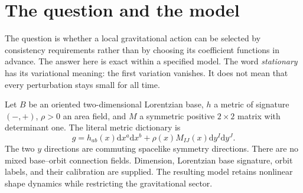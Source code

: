 \documentclass[11pt]{article}
\newcommand{\dd}{\mathrm d}
\begin{document}
\begin{abstract}
We present a conditional selection theorem linking canonical quantum-state geometry to a symmetry-restricted gravitational action. Centered one-mode states saturating the Robertson--Schr\"odinger covariance bound determine positive unimodular matrices with hyperbolic information geometry. A calibrated common frame representation identifies these matrices with the shape of two spacelike symmetry orbits. Within a local invariant action class of total derivative order at most two, full first-variation stationarity of a Milne--polar flat-space chart selects the affine coefficient family and a constant parity-odd coupling. An off-shell identity identifies the selected bulk action with reduced Einstein--Hilbert gravity. We make explicit the associated finite-distance fidelity and Berry-curvature formulas, complete sharp pointwise coefficient-inference bounds, integrate them into near-affine estimates, and test the nonlinear evolution against an exact geodesic/Bessel solution. The accompanying bundle preserves the source lineage and provides 48 compiled Lean theorems, exact symbolic checks, independent quadratures, and bounded numerical convergence controls. The geometric dictionary and theory-class assumptions remain inputs. The results establish an exact model-level connection, with a reproducible proof and computation chain; interacting continuum quantization and empirical applicability remain separate obligations.
\end{abstract}
\tableofcontents
\newpage

\section{The question and the model}
The question is whether a local gravitational action can be selected by consistency requirements rather than by choosing its coefficient functions in advance. The answer here is exact within a specified model. The word \emph{stationary} has its variational meaning: the first variation vanishes. It does not mean that every perturbation stays small for all time.

Let $B$ be an oriented two-dimensional Lorentzian base, $h$ a metric of signature $(-,+)$, $\rho>0$ an area field, and $M$ a symmetric positive $2\times2$ matrix with determinant one. The literal metric dictionary is
\begin{equation}\label{eq:dictionary}
g=h_{ab}(x)\dd x^a\dd x^b+\rho(x)M_{IJ}(x)\dd y^I\dd y^J.
\end{equation}
The two $y$ directions are commuting spacelike symmetry directions. There are no mixed base--orbit connection fields. Dimension, Lorentzian base signature, orbit labels, and their calibration are supplied. The resulting model retains nonlinear shape dynamics while restricting the gravitational sector.
\end{document}
